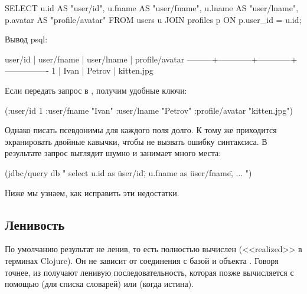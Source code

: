 \begin{english}
  \begin{sql}
SELECT
  u.id     AS "user/id",
  u.fname  AS "user/fname",
  u.lname  AS "user/lname",
  p.avatar AS "profile/avatar"
FROM users u
JOIN profiles p ON p.user_id = u.id;
  \end{sql}
\end{english}

Вывод psql:

\begin{english}
  \begin{text}
 user/id | user/fname | user/lname | profile/avatar
---------+------------+------------+----------------
       1 | Ivan       | Petrov     | kitten.jpg
  \end{text}
\end{english}

Если передать запрос в , получим удобные ключи:

\begin{english}
  \begin{clojure}
({:user/id 1
  :user/fname "Ivan"
  :user/lname "Petrov"
  :profile/avatar "kitten.jpg"})
  \end{clojure}
\end{english}

Однако писать псевдонимы для каждого поля долго. К тому же приходится экранировать двойные кавычки, чтобы не вызвать ошибку синтаксиса. В результате запрос выглядит шумно и занимает много места:

\begin{english}
  \begin{clojure}
(jdbc/query db "
select
u.id as \"user/id\",
u.fname as \"user/fname\",
...
")
  \end{clojure}
\end{english}

Ниже мы узнаем, как исправить эти недостатки.

\subsection{Ленивость}

По умолчанию результат  не ленив, то есть полностью вычислен (<<realized>> в терминах Clojure). Он не зависит от соединения с базой и объекта . Говоря точнее, из  получают ленивую последовательность, которая позже вычисляется с помощью  (для списка словарей) или  (когда  истина).

